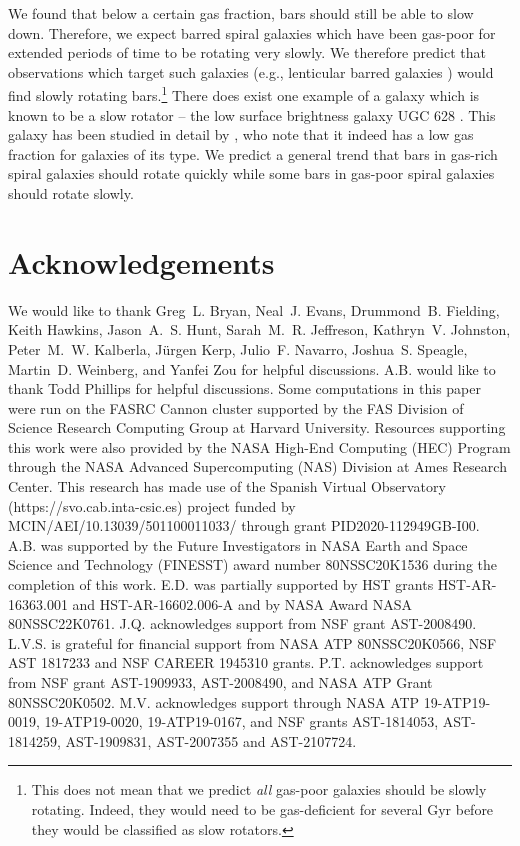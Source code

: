 \documentclass[fleqn,usenatbib]{mnras}
\begin{document}
We found that below a certain gas fraction, bars should still be able to slow
down. Therefore, we expect barred spiral galaxies which have been gas-poor for
extended periods of time to be rotating very slowly. We therefore predict that
observations which target such galaxies (e.g., lenticular barred galaxies
\citep{2009ARAA..47..159B}) would find slowly rotating bars.\footnote{This does
not mean that we predict \textit{all} gas-poor galaxies should be slowly
rotating. Indeed, they would need to be gas-deficient for several $\textrm{Gyr}$
before they would be classified as slow rotators.} There does exist one example
of a galaxy which is known to be a slow rotator -- the low surface brightness
galaxy UGC 628 \citep{2009AA...499L..25C}. This galaxy has been studied in
detail by \citet{2016MNRAS.463.1751C}, who note that it indeed has a low gas
fraction for galaxies of its type. We predict a general trend that bars in
gas-rich spiral galaxies should rotate quickly while some bars in gas-poor
spiral galaxies should rotate slowly.

\section*{Acknowledgements}
We would like to thank Greg~L. Bryan, Neal~J. Evans, Drummond~B. Fielding, Keith
Hawkins, Jason~A.~S. Hunt, Sarah~M.~R. Jeffreson, Kathryn~V. Johnston,
Peter~M.~W. Kalberla, Jürgen Kerp, Julio~F. Navarro, Joshua~S. Speagle,
Martin~D. Weinberg, and Yanfei Zou for helpful discussions. A.B. would like to
thank Todd Phillips for helpful discussions. Some computations in this paper
were run on the FASRC Cannon cluster supported by the FAS Division of Science
Research Computing Group at Harvard University. Resources supporting this work
were also provided by the NASA High-End Computing (HEC) Program through the NASA
Advanced Supercomputing (NAS) Division at Ames Research Center. This research
has made use of the Spanish Virtual Observatory (https://svo.cab.inta-csic.es)
project funded by MCIN/AEI/10.13039/501100011033/ through grant
PID2020-112949GB-I00. A.B. was supported by the Future Investigators in NASA
Earth and Space Science and Technology (FINESST) award number 80NSSC20K1536
during the completion of this work. E.D. was partially supported by HST grants
HST-AR-16363.001 and HST-AR-16602.006-A and by NASA Award NASA 80NSSC22K0761.
J.Q. acknowledges support from NSF grant AST-2008490. L.V.S. is grateful for
financial support from NASA ATP 80NSSC20K0566, NSF AST 1817233 and NSF CAREER
1945310 grants. P.T. acknowledges support from NSF grant AST-1909933,
AST-2008490, and NASA ATP Grant 80NSSC20K0502. M.V. acknowledges support through
NASA ATP 19-ATP19-0019, 19-ATP19-0020, 19-ATP19-0167, and NSF grants
AST-1814053, AST-1814259, AST-1909831, AST-2007355 and AST-2107724.
\end{document}
